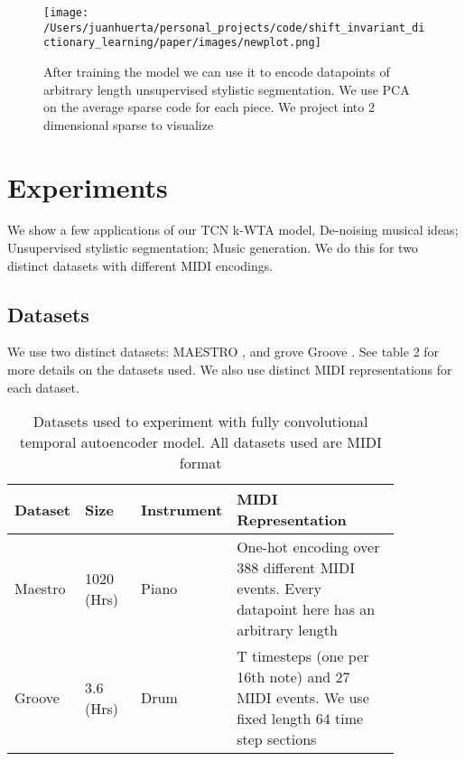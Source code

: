 \documentclass[11pt,a4paper]{article}
\begin{document}
\begin{figure*}[ht]
  \texttt{[image: /Users/juanhuerta/personal\_projects/code/shift\_invariant\_dictionary\_learning/paper/images/newplot.png]}
  \caption{After training the model we can use it to encode datapoints of arbitrary length unsupervised stylistic segmentation. We use PCA on the average sparse code for each piece. We project into 2 dimensional sparse to visualize }
  \label{fig:boat1}
\end{figure*}




\section{Experiments}
\label{ssec:experiments}

We show a few applications of our TCN k-WTA model, De-noising musical ideas; Unsupervised stylistic segmentation; Music generation. We do this for two distinct datasets with different MIDI encodings.


\subsection{Datasets}
\label{ssec:experiments}

We use two distinct datasets: MAESTRO  \cite{hawthorne2018enabling}, and  grove Groove  \cite{groove2019} . See table 2 for more details on the datasets used. We also use distinct MIDI representations for each dataset. 

\begin{table*}[ht]
    \centering
    \begin{tabular}{p{0.15\linewidth} | p{0.15\linewidth} | p{0.1\linewidth}  | p{0.45\linewidth} }
      Dataset  & Size  & Instrument &  MIDI Representation\\ \hline
      Maestro  & 1020 (Hrs)   & Piano &  One-hot encoding over 388 different MIDI events. Every datapoint here has an arbitrary length \\
        \hline
        Groove & 3.6 (Hrs)  & Drum &  T timesteps (one per 16th note) and 27 MIDI events. We use fixed length 64 time step sections\\
    \end{tabular}
    \caption{Datasets used to experiment with fully convolutional temporal autoencoder model. All datasets used are MIDI format }
    \label{tab:my_label}
\end{table*}
\end{document}
